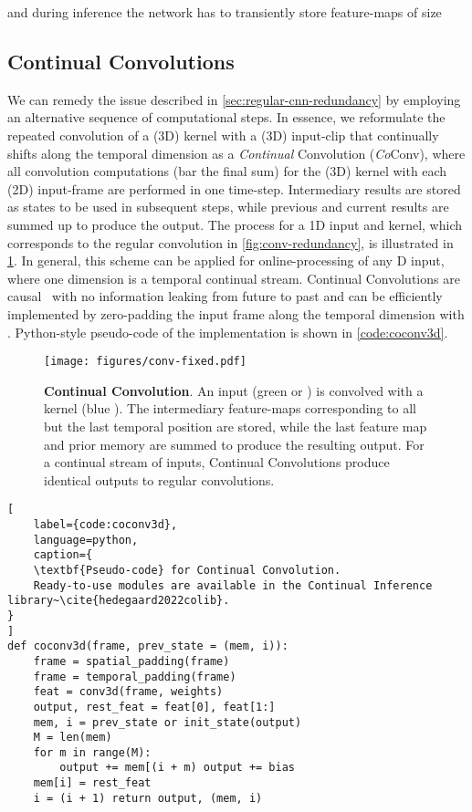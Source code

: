 \documentclass[runningheads]{llncs}
\begin{document}
and during inference the network has to transiently store feature-maps of size 





\vspace{-3mm}
\subsection{Continual Convolutions}
\vspace{-1mm}
We can remedy the issue described in \cref{sec:regular-cnn-redundancy} by employing an alternative sequence of computational steps. 
In essence, we reformulate the repeated convolution of a (3D) kernel with a (3D) input-clip that continually shifts along the temporal dimension as a \textit{Continual} Convolution (\textit{Co}Conv), where all convolution computations (bar the final sum) for the (3D) kernel with each (2D) input-frame are performed in one time-step. 
Intermediary results are stored as states to be used in subsequent steps, while previous and current results are summed up to produce the output. 
The process for a 1D input and kernel, which corresponds to the regular convolution in \cref{fig:conv-redundancy}, is illustrated in \cref{fig:conv-fixed}. 
In general, this scheme can be applied for online-processing of any D input, where one dimension is a temporal continual stream.
Continual Convolutions are causal~\cite{oord2016wavenet} with no information leaking from future to past 
and can be efficiently implemented by zero-padding the input frame along the temporal dimension with . 
Python-style pseudo-code of the implementation is shown in \cref{code:coconv3d}.
\begin{figure}
    \centering
    \texttt{[image: figures/conv-fixed.pdf]}
	\caption{
	\textbf{Continual Convolution}. 
	An input (green  or ) is convolved with a kernel (blue ). The intermediary feature-maps corresponding to all but the last temporal position are stored, while the last feature map and prior memory are summed to produce the resulting output. For a continual stream of inputs, Continual Convolutions produce identical outputs to regular convolutions.
	}
    \label{fig:conv-fixed}
    \vspace{-5mm}
\end{figure}
\begin{center}
\noindent\begin{minipage}{0.8\columnwidth}
\begin{lstlisting}[
    label={code:coconv3d},
    language=python,
    caption={
    \textbf{Pseudo-code} for Continual Convolution.
    Ready-to-use modules are available in the Continual Inference library~\cite{hedegaard2022colib}.
}
]
def coconv3d(frame, prev_state = (mem, i)):
    frame = spatial_padding(frame)
    frame = temporal_padding(frame)
    feat = conv3d(frame, weights) 
    output, rest_feat = feat[0], feat[1:]
    mem, i = prev_state or init_state(output)
    M = len(mem)
    for m in range(M):
        output += mem[(i + m) output += bias
    mem[i] = rest_feat
    i = (i + 1) return output, (mem, i)
\end{lstlisting}
\end{minipage}
\end{center}
\end{document}
